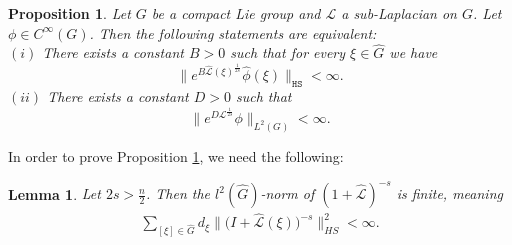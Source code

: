 \documentclass[12pt,oneside,a4paper]{book}
\numberwithin{equation}{section}     %
\theoremstyle{plain}
\newtheorem{proposition}[theorem]{Proposition}
\newtheorem{lemma}[theorem]{Lemma}
\theoremstyle{definition}
\newcommand{\slp}{{\mathcal L}}
\newcommand{\HS}{{\mathtt{HS}}}
\newcommand{\Gh}{{\widehat{G}}}
\begin{document}
\begin{proposition}\label{PROP:ft-equiv}
	Let $G$ be a compact Lie group and $\slp$ a sub-Laplacian on $G$. Let $\phi\in C^{\infty}(G)$. Then the following statements are equivalent:\\
	$(i)$ There exists a constant $B>0$ such that for every $\xi\in\widehat G$ we have
	\begin{equation}\label{HS}
	\|e^{B\widehat\slp(\xi)^{\frac{1}{2s}}}\widehat \phi(\xi)\|_{\HS}<\infty.
	\end{equation}
	$(ii)$ There exists a constant $D>0$ such that  
	\begin{equation}\label{l2}
	\|e^{D\slp^{\frac{1}{2s}}}\phi\|_{L^2(G)}<\infty.
	\end{equation}
\end{proposition} 
In order to prove Proposition \ref{PROP:ft-equiv}, we need the following:
\begin{lemma}\label{Lem:Bessel}
	Let $2s>\frac{n}{2}$. Then the $l^2(\Gh)$-norm of $(1+\widehat{\slp})^{-s}$ is finite, meaning
	\begin{align*}
	\sum_{[\xi]\in\Gh}d_\xi\|\big(I+\widehat{\slp}(\xi)\big)^{-s}\|_{HS}^2<\infty.
	\end{align*}
\end{lemma}
\end{document}
